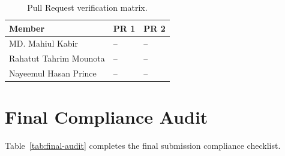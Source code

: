\documentclass{iutbscthesis}
\begin{document}
\begin{appendices}
\begin{table}[H]
\centering
\small
\begin{tabular}{p{}p{}p{}}
\toprule
\textbf{Member} & \textbf{PR 1} & \textbf{PR 2} \\
\midrule
MD. Mahiul Kabir & -- & -- \\
Rahatut Tahrim Mounota & -- & -- \\
Nayeemul Hasan Prince & -- & -- \\
\bottomrule
\end{tabular}
\caption{Pull Request verification matrix.}
\label{tab:pr-verification}
\end{table}

\chapter{Final Compliance Audit}
Table~\ref{tab:final-audit} completes the final submission compliance checklist.


\end{appendices}
\end{document}

